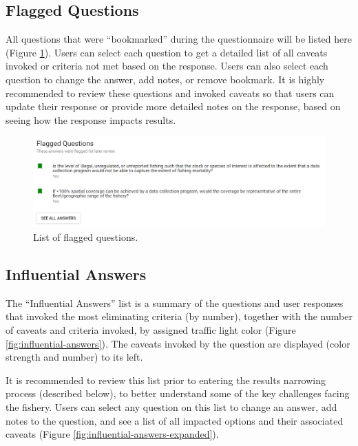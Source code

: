 \documentclass[11pt,]{book}
\begin{document}
\hypertarget{flagged-questions}{%
\subsection{Flagged Questions}\label{flagged-questions}}

All questions that were ``bookmarked'' during the questionnaire will be listed here (Figure \ref{fig:flagged-questions}). Users can select each question to get a detailed list of all caveats invoked or criteria not met based on the response. Users can also select each question to change the answer, add notes, or remove bookmark. It is highly recommended to review these questions and invoked caveats so that users can update their response or provide more detailed notes on the response, based on seeing how the response impacts results.

\begin{figure}

{\centering \includegraphics[width=0.95\linewidth]{images/flagged-questions} 

}

\caption{List of flagged questions.}\label{fig:flagged-questions}
\end{figure}

\hypertarget{influential-answers}{%
\subsection{Influential Answers}\label{influential-answers}}

The ``Influential Answers'' list is a summary of the questions and user responses that invoked the most eliminating criteria (by number), together with the number of caveats and criteria invoked, by assigned traffic light color (Figure \ref{fig:influential-answers}). The caveats invoked by the question are displayed (color strength and number) to its left.

It is recommended to review this list prior to entering the results narrowing process (described below), to better understand some of the key challenges facing the fishery. Users can select any question on this list to change an answer, add notes to the question, and see a list of all impacted options and their associated caveats (Figure \ref{fig:influential-answers-expanded}).
\end{document}
